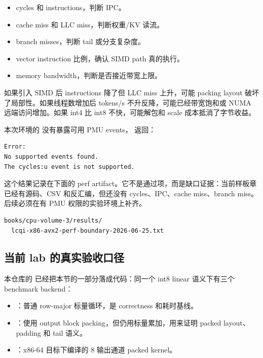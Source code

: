 \begin{itemize}
  \item cycles 和 instructions，判断 IPC。
  \item cache miss 和 LLC miss，判断权重/KV 读流。
  \item branch misses，判断 tail 或分支复杂度。
  \item vector instruction 比例，确认 SIMD path 真的执行。
  \item memory bandwidth，判断是否接近带宽上限。
\end{itemize}

如果引入 SIMD 后 instructions 降了但 LLC miss 上升，可能 packing layout 破坏了局部性。如果线程数增加后 tokens/s 不升反降，可能已经带宽饱和或 NUMA 远端访问增加。如果 int4 比 int8 不快，可能解包和 scale 成本抵消了字节收益。

本次环境的  没有暴露可用 PMU events， 返回：

\begin{lstlisting}[numbers=none,caption={当前实验环境的 perf 边界，不伪造计数器}]
Error:
No supported events found.
The cycles:u event is not supported.
\end{lstlisting}

这个结果记录在下面的 perf artifact。它不是通过项，而是缺口证据：当前样板章已经有源码、CSV 和反汇编，但还没有 cycles、IPC、cache miss、branch miss。后续必须在有 PMU 权限的实验环境上补齐。

\begin{lstlisting}[numbers=none,caption={perf artifact}]
books/cpu-volume-3/results/
  lcqi-x86-avx2-perf-boundary-2026-06-25.txt
\end{lstlisting}

\subsection{当前 lab 的真实验收口径}

本仓库的  已经把本节的一部分落成代码：同一个 int8 linear 语义下有三个 benchmark backend：

\begin{itemize}
  \item {}：普通 row-major 标量循环，是 correctness 和耗时基线。
  \item {}：使用 output block packing，但仍用标量累加，用来证明 packed layout、padding 和 tail 语义。
  \item {}：x86-64 目标下编译的 8 输出通道 packed kernel。
\end{itemize}

